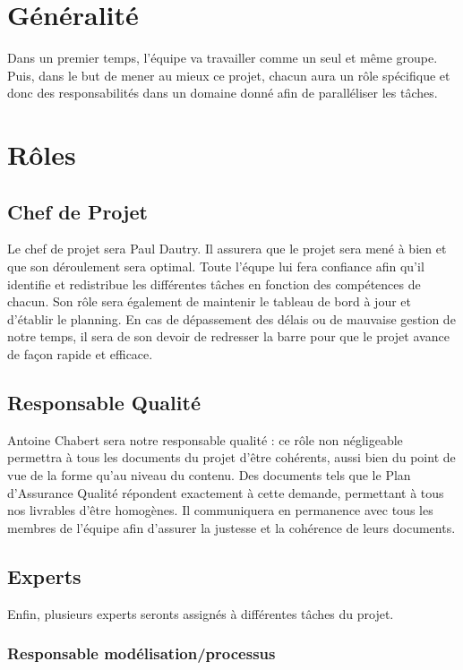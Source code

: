 \section{Généralité}

Dans un premier temps, l’équipe va travailler comme un seul et même groupe. Puis, dans le but de mener au mieux ce projet, chacun aura un rôle spécifique et donc des responsabilités dans un domaine donné afin de paralléliser les tâches.

\section{Rôles}

\subsection{Chef de Projet}

Le chef de projet sera Paul Dautry.
Il assurera que le projet sera mené à bien et que son déroulement sera optimal. Toute l’équpe lui fera confiance afin qu’il identifie et redistribue les différentes tâches en fonction des compétences de chacun. Son rôle sera également de maintenir le tableau de bord à jour et d’établir le planning. En cas de dépassement des délais ou de mauvaise gestion de notre temps, il sera de son devoir de redresser la barre pour que le projet avance de façon rapide et efficace.

\subsection{Responsable Qualité}

Antoine Chabert sera notre responsable qualité : ce rôle non négligeable permettra à tous les documents du projet d’être cohérents, aussi bien du point de vue de la forme qu’au niveau du contenu. Des documents tels que le Plan d’Assurance Qualité répondent exactement à cette demande, permettant à tous nos livrables d’être homogènes.
    Il communiquera en permanence avec tous les membres de l’équipe afin d’assurer la justesse et la cohérence de leurs documents.

\subsection{Experts}

Enfin, plusieurs experts seronts assignés à différentes tâches du projet.

\subsubsection{Responsable modélisation/processus}

